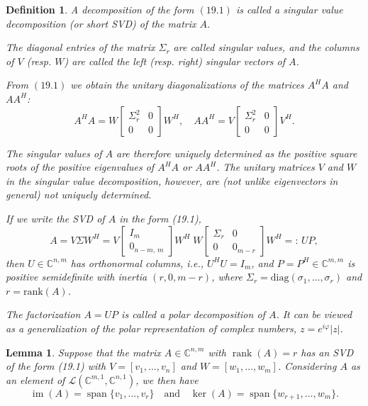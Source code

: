 \documentclass{article}
\newtheorem{definition}{Definition}[section]
\newtheorem{lemma}{Lemma}[section]
\begin{document}
\begin{definition}
A decomposition of the form \((19.1)\) is called a \emph{singular value decomposition}  
(or short \emph{SVD}) of the matrix \(A\).  

The diagonal entries of the matrix \(\Sigma_r\) are called \emph{singular values},  
and the columns of \(V\) (resp. \(W\)) are called the \emph{left} (resp. \emph{right})  
singular vectors of \(A\).

From \((19.1)\) we obtain the unitary diagonalizations of the matrices \(A^H A\) and \(A A^H\):
\[
A^H A =
W
\begin{bmatrix}
\Sigma_r^2 & 0 \\
0 & 0
\end{bmatrix}
W^H,
\quad
A A^H =
V
\begin{bmatrix}
\Sigma_r^2 & 0 \\
0 & 0
\end{bmatrix}
V^H.
\]

The singular values of \(A\) are therefore uniquely determined as the positive square roots  
of the positive eigenvalues of \(A^H A\) or \(A A^H\).  
The unitary matrices \(V\) and \(W\) in the singular value decomposition, however, are  
(not unlike eigenvectors in general) not uniquely determined.

If we write the SVD of $A$ in the form (19.1),
\[
A = V \Sigma W^H
= V
\begin{bmatrix}
I_m \\[2pt]
0_{n-m,\,m}
\end{bmatrix}
W^H \;
W
\begin{bmatrix}
\Sigma_r & 0 \\
0 & 0_{m-r}
\end{bmatrix}
W^H
=:\, U P,
\]
then $U \in \mathbb{C}^{n,m}$ has orthonormal columns, i.e., $U^H U = I_m$, and
$P = P^H \in \mathbb{C}^{m,m}$ is positive semidefinite with inertia $(r,0,m-r)$,
where $\Sigma_r = \mathrm{diag}(\sigma_1,\dots,\sigma_r)$ and $r=\mathrm{rank}(A)$.

The factorization $A = U P$ is called a \emph{polar decomposition} of $A$.
It can be viewed as a generalization of the polar representation of complex numbers,
$z = e^{i\varphi}\lvert z\rvert$.

\end{definition}

\vspace{1cm}

\begin{lemma}
Suppose that the matrix $A \in \mathbb{C}^{n,m}$ with $\operatorname{rank}(A)=r$ has an SVD of the form (19.1) with $V = [v_1,\dots,v_n]$ and $W = [w_1,\dots,w_m]$.
Considering $A$ as an element of $\mathcal{L}(\mathbb{C}^{m,1}, \mathbb{C}^{n,1})$, we then have
\[
\operatorname{im}(A) = \operatorname{span}\{v_1,\dots,v_r\}
\quad\text{and}\quad
\ker(A) = \operatorname{span}\{w_{r+1},\dots,w_m\}.
\]
\end{lemma}
\end{document}

